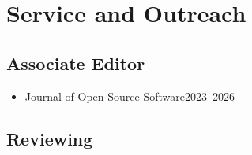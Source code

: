 \documentclass{cv}
\begin{document}

\section{Service and Outreach}

\subsection{Associate Editor}

\begin{itemize}[itemsep=-0.2ex]
\item
Journal of Open Source Software\hfill 2023--2026
\end{itemize}

\subsection{Reviewing}
\end{document}
